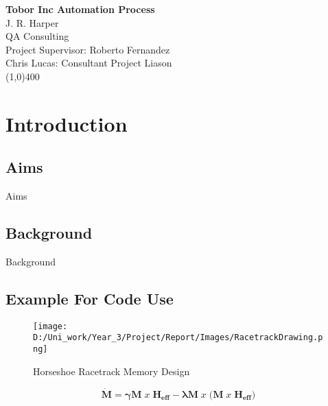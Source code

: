 \documentclass[12]{article}
\begin{document}
\begin{titlepage}
\begin{center}
	
	\LARGE{\bf{Tobor Inc Automation Process}}\\
	[1cm]
	\large{J. R. Harper \\ QA Consulting \\ Project Supervisor: Roberto Fernandez}\\
	\large{Chris Lucas: Consultant Project Liason } \\
	[0.2cm]
	\line(1,0){400} \\
	
\end{center}


\end{titlepage}

\cleardoublepage

\tableofcontents

\thispagestyle{empty}

\cleardoublepage


\section{Introduction}\label{sec:intro}

\setcounter{page}{1}

\subsection{Aims}

Aims

\subsection{Background}

Background

\subsection{Example For Code Use}

\begin{figure}[H]
	\centering
	\texttt{[image: D:/Uni\_work/Year\_3/Project/Report/Images/RacetrackDrawing.png]}
	\caption[IBM]{Horseshoe Racetrack Memory Design}
	\label{fig:Racetrack}
\end{figure}

\begin{equation}\label{eq:LL}
\bm{\dot{M}} = \bm{ \gamma M} \; x \; \bm{ H_{eff}} - \bm{ \lambda M} \; x \; \bm{  (M } \; x \; \bm{ H_{eff})}
\end{equation}
\end{document}
